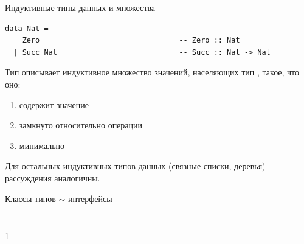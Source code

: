 \documentclass[aspectratio=169
  , xcolor={svgnames}
  , hyperref={ colorlinks,citecolor=DeepPink4
             , linkcolor=DarkRed,urlcolor=DarkBlue}
  , russian
  ]{beamer}
\theoremstyle{exerciseStyle1}
\begin{document}
\begin{frame}[fragile]{Индуктивные типы данных и множества}
\begin{verbatim}
data Nat = 
    Zero                                -- Zero :: Nat
  | Succ Nat                            -- Succ :: Nat -> Nat
\end{verbatim}
Тип  описывает индуктивное множество значений, населяющих тип , такое, что оно:
\begin{enumerate}
  \item содержит значение 
  \item замкнуто относительно операции 
  \item минимально
\end{enumerate}

Для остальных индуктивных типов данных (связные списки, деревья) рассуждения аналогичны.
\end{frame}

\begin{frame}[fragile]{Классы типов $\sim$ интерфейсы}
\begin{minipage}{.48\textwidth}
  \inputminted[firstline=9,lastline=15]{haskell}{code/Stacks.hs}
\end{minipage}
\begin{minipage}{.48\textwidth}
  \inputminted[firstline=16,lastline=26]{haskell}{code/Stacks.hs}
\end{minipage}
\end{frame}










\begin{frame}[fragile]{}
1
\end{frame}

\end{document}
